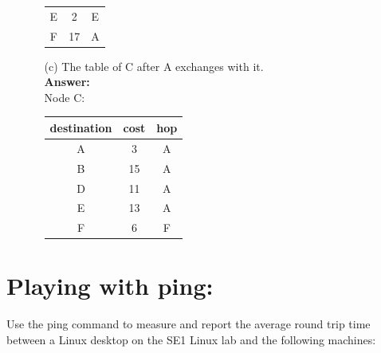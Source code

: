 \documentclass[a4paper]{article}
\begin{document}
\begin{itemize}
\begin{itemize}
\begin{tabular}{c|c|c}
	      	E & 2  & E \\
	      	F & 17 & A \\
	      	\end{tabular}
	      	\item[(c)] The table of C after A exchanges with it. \\
	      	      \textbf{Answer:} \\
	      	      Node C: \begin{tabular}{c|c|c}
	      	      destination & cost & hop \\
	      	      \hline
	      	      A & 3  & A \\
	      	      B & 15 & A \\
	      	      D & 11 & A \\
	      	      E & 13 & A \\
	      	      F & 6  & F \\
	      	\end{tabular}
	      \end{itemize} 
\end{itemize}

\section*{Playing with ping:}

Use the ping command to measure and report the average round trip time between a Linux desktop on the SE1 Linux lab and the following machines:
\end{document}
